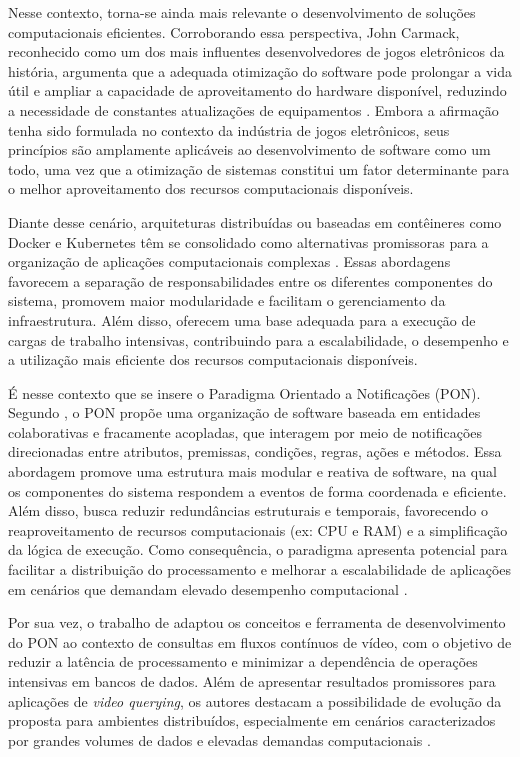 Nesse contexto, torna-se ainda mais relevante o desenvolvimento de soluções computacionais eficientes. Corroborando essa perspectiva, John Carmack, reconhecido como um dos mais influentes desenvolvedores de jogos eletrônicos da história, argumenta que a adequada otimização do software pode prolongar a vida útil e ampliar a capacidade de aproveitamento do hardware disponível, reduzindo a necessidade de constantes atualizações de equipamentos \cite{plaza2026doom}. Embora a afirmação tenha sido formulada no contexto da indústria de jogos eletrônicos, seus princípios são amplamente aplicáveis ao desenvolvimento de software como um todo, uma vez que a otimização de sistemas constitui um fator determinante para o melhor aproveitamento dos recursos computacionais disponíveis.


Diante desse cenário, arquiteturas distribuídas ou baseadas em contêineres como Docker e Kubernetes têm se consolidado como alternativas promissoras para a organização de aplicações computacionais complexas \cite{docker2026documentation, kubernetes2026documentation}. Essas abordagens favorecem a separação de responsabilidades entre os diferentes componentes do sistema, promovem maior modularidade e facilitam o gerenciamento da infraestrutura. Além disso, oferecem uma base adequada para a execução de cargas de trabalho intensivas, contribuindo para a escalabilidade, o desempenho e a utilização mais eficiente dos recursos computacionais disponíveis.


É nesse contexto que se insere o Paradigma Orientado a Notificações (PON). Segundo \citet{Neves2021mastersframework4}, o PON propõe uma organização de software baseada em entidades colaborativas e fracamente acopladas, que interagem por meio de notificações direcionadas entre atributos, premissas, condições, regras, ações e métodos. Essa abordagem promove uma estrutura mais modular e reativa de software, na qual os componentes do sistema respondem a eventos de forma coordenada e eficiente. Além disso, busca reduzir redundâncias estruturais e temporais, favorecendo o reaproveitamento de recursos computacionais (ex: CPU e RAM) e a simplificação da lógica de execução. Como consequência, o paradigma apresenta potencial para facilitar a distribuição do processamento e melhorar a escalabilidade de aplicações em cenários que demandam elevado desempenho computacional \cite{ronszcka2019phdcompiladores}. 

Por sua vez, o trabalho de \citet{kossoski2024applsci} adaptou os conceitos e ferramenta de desenvolvimento do PON ao contexto de consultas em fluxos contínuos de vídeo, com o objetivo de reduzir a latência de processamento e minimizar a dependência de operações intensivas em bancos de dados. Além de apresentar resultados promissores para aplicações de \textit{video querying}, os autores destacam a possibilidade de evolução da proposta para ambientes distribuídos, especialmente em cenários caracterizados por grandes volumes de dados e elevadas demandas computacionais \cite{kossoski2024applsci}.

